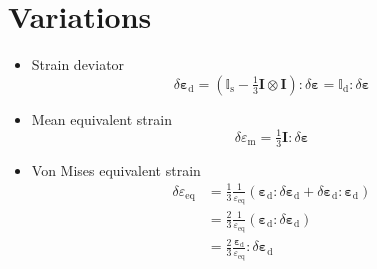 \documentclass[times,namecite]{goose-article}
\begin{document}
\section{Variations}
\label{sec:variations}

\begin{itemize}
%
\item Strain deviator
\begin{equation}
  \delta \bm{\varepsilon}_\mathrm{d}
  = \left( \mathbb{I}_\mathrm{s} - \tfrac{1}{3} \bm{I} \otimes \bm{I} \right) :
    \delta \bm{\varepsilon}
  = \mathbb{I}_\mathrm{d} : \delta \bm{\varepsilon}
\end{equation}
%
\item Mean equivalent strain
\begin{equation}
  \delta \varepsilon_\mathrm{m}
  = \tfrac{1}{3} \bm{I} : \delta \bm{\varepsilon}
\end{equation}
%
\item Von Mises equivalent strain
\begin{align}
  \delta \varepsilon_\mathrm{eq}
  &= \frac{1}{3} \frac{1}{\varepsilon_\mathrm{eq}}
     \left( \bm{\varepsilon}_\mathrm{d} : \delta \bm{\varepsilon}_\mathrm{d} +
     \delta \bm{\varepsilon}_\mathrm{d} : \bm{\varepsilon}_\mathrm{d} \right) \\
  &= \frac{2}{3} \frac{1}{\varepsilon_\mathrm{eq}}
     \left( \bm{\varepsilon}_\mathrm{d} : \delta \bm{\varepsilon}_\mathrm{d} \right) \\
  &= \frac{2}{3} \frac{\bm{\varepsilon}_\mathrm{d}}{\varepsilon_\mathrm{eq}} :
     \delta \bm{\varepsilon}_\mathrm{d}
\end{align}
%
\end{itemize}


% 
\end{document}
